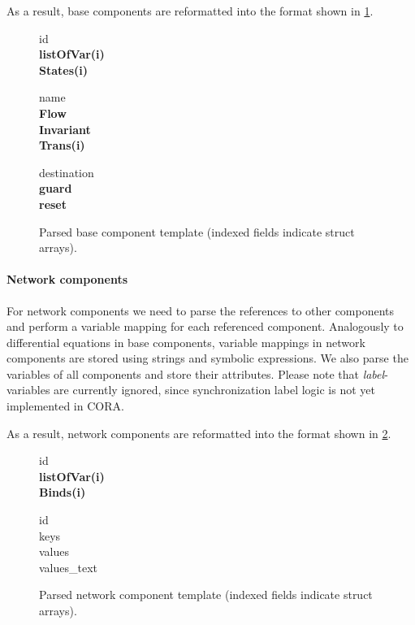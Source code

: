 As a result, base components are reformatted into the format shown in \cref{fig:baseComponentStructure}.
\begin{figure}[htb] %
\begin{nestedlist}
  \begin{nestedlist}
    id \\
    \textbf{listOfVar(i)} \\
    \textbf{States(i)}
    \begin{nestedlist}
      name \\
      \textbf{Flow} \\
      \textbf{Invariant} \\
      \textbf{Trans(i)}
      \begin{nestedlist}
        destination \\
        \textbf{guard} \\
        \textbf{reset}
      \end{nestedlist}
    \end{nestedlist}
  \end{nestedlist}
\end{nestedlist}
\caption{Parsed base component template (indexed fields indicate struct arrays).}
\label{fig:baseComponentStructure}
\end{figure}


\paragraph{Network components} For network components we need to parse the references to other components and perform a variable mapping for each referenced component. Analogously to differential equations in base components, variable mappings in network components are stored using strings and symbolic expressions. We also parse the variables of all components and store their attributes. Please note that \textit{label}-variables are currently ignored, since synchronization label logic is not yet implemented in CORA.

As a result, network components are reformatted into the format shown in \cref{fig:networkComponentStructure}.

\begin{figure}[htb] %
\begin{nestedlist}
  \begin{nestedlist}
    id \\
    \textbf{listOfVar(i)} \\
    \textbf{Binds(i)}
    \begin{nestedlist}
      id \\
      keys \\
      values \\
      values\_text
    \end{nestedlist}
  \end{nestedlist}
\end{nestedlist}
\caption{Parsed network component template (indexed fields indicate struct arrays).}
\label{fig:networkComponentStructure}
\end{figure}

